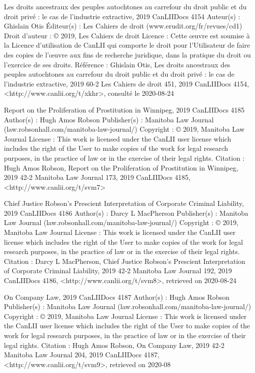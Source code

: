 Les droits ancestraux des peuples autochtones au carrefour du droit public et du droit privé : le cas de l’industrie extractive, 2019 CanLIIDocs 4154
Auteur(s) : 	Ghislain Otis
Éditeur(s) : 	Les Cahiers de droit (www.erudit.org/fr/revues/cd1)
Droit d'auteur : 	© 2019, Les Cahiers de droit
Licence : 	Cette œuvre est soumise à la Licence d’utilisation de CanLII qui comporte le droit pour l’Utilisateur de faire des copies de l’œuvre aux fins de recherche juridique, dans la pratique du droit ou l’exercice de ses droits.
Référence : 	Ghislain Otis, Les droits ancestraux des peuples autochtones au carrefour du droit public et du droit privé : le cas de l’industrie extractive, 2019 60-2 Les Cahiers de droit 451, 2019 CanLIIDocs 4154, <http://www.canlii.org/t/xkhr>, consulté le 2020-08-24


Report on the Proliferation of Prostitution in Winnipeg, 2019 CanLIIDocs 4185
Author(s) : 	Hugh Amos Robson
Publisher(s) : 	Manitoba Law Journal (law.robsonhall.com/manitoba-law-journal/)
Copyright : 	© 2019, Manitoba Law Journal
License : 	This work is licensed under the CanLII user license which includes the right of the User to make copies of the work for legal research purposes, in the practice of law or in the exercise of their legal rights.
Citation : 	Hugh Amos Robson, Report on the Proliferation of Prostitution in Winnipeg, 2019 42-2 Manitoba Law Journal 173, 2019 CanLIIDocs 4185, <http://www.canlii.org/t/svm7>

Chief Justice Robson’s Prescient Interpretation of Corporate Criminal Liability, 2019 CanLIIDocs 4186
Author(s) : 	Darcy L MacPherson
Publisher(s) : 	Manitoba Law Journal (law.robsonhall.com/manitoba-law-journal/)
Copyright : 	© 2019, Manitoba Law Journal
License : 	This work is licensed under the CanLII user license which includes the right of the User to make copies of the work for legal research purposes, in the practice of law or in the exercise of their legal rights.
Citation : 	Darcy L MacPherson, Chief Justice Robson’s Prescient Interpretation of Corporate Criminal Liability, 2019 42-2 Manitoba Law Journal 192, 2019 CanLIIDocs 4186, <http://www.canlii.org/t/svm8>, retrieved on 2020-08-24


On Company Law, 2019 CanLIIDocs 4187
Author(s) : 	Hugh Amos Robson
Publisher(s) : 	Manitoba Law Journal (law.robsonhall.com/manitoba-law-journal/)
Copyright : 	© 2019, Manitoba Law Journal
License : 	This work is licensed under the CanLII user license which includes the right of the User to make copies of the work for legal research purposes, in the practice of law or in the exercise of their legal rights.
Citation : 	Hugh Amos Robson, On Company Law, 2019 42-2 Manitoba Law Journal 204, 2019 CanLIIDocs 4187, <http://www.canlii.org/t/svm9>, retrieved on 2020-08


